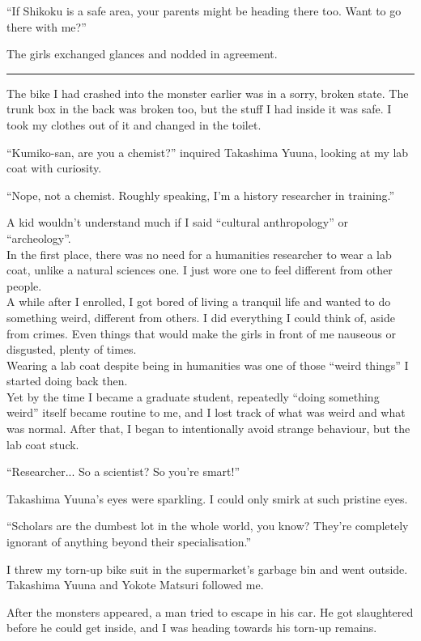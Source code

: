 ``If Shikoku is a safe area, your parents might be heading there too. Want to go there with me?''

The girls exchanged glances and nodded in agreement.

\vspace{\baselineskip}
\hrule
\vspace{\baselineskip}

The bike I had crashed into the monster earlier was in a sorry, broken state. The trunk box in the back was broken too, but the stuff I had inside it was safe. I took my clothes out of it and changed in the toilet.

``Kumiko-san, are you a chemist?'' inquired Takashima Yuuna, looking at my lab coat with curiosity.

``Nope, not a chemist. Roughly speaking, I'm a history researcher in training.''

A kid wouldn't understand much if I said ``cultural anthropology'' or ``archeology''. \\
In the first place, there was no need for a humanities researcher to wear a lab coat, unlike a natural sciences one. I just wore one to feel different from other people. \\
A while after I enrolled, I got bored of living a tranquil life and wanted to do something weird, different from others. I did everything I could think of, aside from crimes. Even things that would make the girls in front of me nauseous or disgusted, plenty of times. \\
Wearing a lab coat despite being in humanities was one of those ``weird things'' I started doing back then. \\
Yet by the time I became a graduate student, repeatedly ``doing something weird'' itself became routine to me, and I lost track of what was weird and what was normal. After that, I began to intentionally avoid strange behaviour, but the lab coat stuck.

``Researcher... So a scientist? So you're smart!''

Takashima Yuuna's eyes were sparkling. I could only smirk at such pristine eyes.

``Scholars are the dumbest lot in the whole world, you know? They're completely ignorant of anything beyond their specialisation.''

I threw my torn-up bike suit in the supermarket's garbage bin and went outside. Takashima Yuuna and Yokote Matsuri followed me.

After the monsters appeared, a man tried to escape in his car. He got slaughtered before he could get inside, and I was heading towards his torn-up remains.

